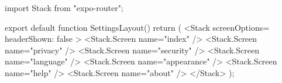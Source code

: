 import { Stack } from "expo-router";

export default function SettingsLayout() {
  return (
    <Stack screenOptions={{ headerShown: false }}>
      <Stack.Screen name="index" />
      <Stack.Screen name="privacy" />
      <Stack.Screen name="security" />
      <Stack.Screen name="language" />
      <Stack.Screen name="appearance" />
      <Stack.Screen name="help" />
      <Stack.Screen name="about" />
    </Stack>
  );
}
